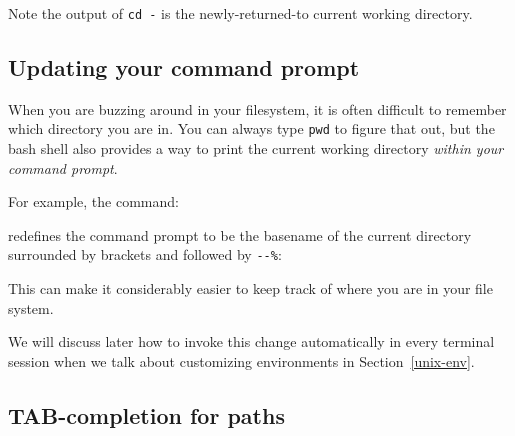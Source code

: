 \documentclass[]{krantz}
\makeatletter
\newenvironment{Shaded}{\begin{snugshade}}{\end{snugshade}}
\newcommand{\ExtensionTok}[1]{#1}
\newcommand{\NormalTok}[1]{#1}
\newcommand{\StringTok}[1]{\textcolor[rgb]{0.5,0.5,0.5}{#1}}
\newcommand{\VariableTok}[1]{\textcolor[rgb]{0,0,0}{#1}}
\newenvironment{kframe}{%
\medskip{}
\setlength{\fboxsep}{.8em}
 \def\at@end@of@kframe{}%
 \ifinner\ifhmode%
  \def\at@end@of@kframe{\end{minipage}}%
  \begin{minipage}{\columnwidth}%
 \fi\fi%
 \def\FrameCommand##1{\hskip\@totalleftmargin \hskip-\fboxsep
 \colorbox{shadecolor}{##1}\hskip-\fboxsep
     \hskip-\linewidth \hskip-\@totalleftmargin \hskip\columnwidth}%
 \MakeFramed {\advance\hsize-\width
   \@totalleftmargin\z@ \linewidth\hsize
   \@setminipage}}%
 {\par\unskip\endMakeFramed%
 \at@end@of@kframe}
\renewenvironment{Shaded}{\begin{kframe}}{\end{kframe}}
\makeatother
\begin{document}
Note the output of \texttt{cd\ -} is the newly-returned-to current working directory.

\hypertarget{comm-prompt}{%
\subsection{Updating your command prompt}\label{comm-prompt}}

When you are buzzing around in your filesystem, it is often difficult to remember
which directory you are in. You can always type \texttt{pwd} to figure that out,
but the bash shell also provides a way to print the current working directory
\emph{within your command prompt}.

For example, the command:

\begin{Shaded}
\end{Shaded}

redefines the command prompt to be the basename of the current directory surrounded
by brackets and followed by \texttt{-\/-\%}:

\begin{Shaded}
\end{Shaded}

This can make it considerably easier to keep track of where you are in your file system.

We will discuss later how to invoke this change automatically in every terminal session
when we talk about customizing environments in Section~\ref{unix-env}.

\hypertarget{tab-completion-for-paths}{%
\subsection{TAB-completion for paths}\label{tab-completion-for-paths}}
\end{document}
